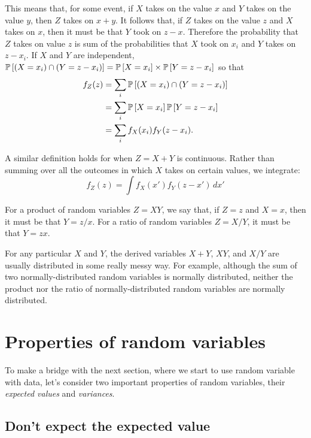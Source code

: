 This means that, for some event, if $X$ takes on the value $x$ and $Y$ takes
on the value $y$, then $Z$ takes on $x+y$. It follows that, if
$Z$ takes on the value $z$ and $X$ takes on $x$, then it must be that $Y$
took on $z - x$. Therefore the probability that $Z$ takes on value $z$ is
sum of the probabilities that $X$ took on $x_i$ and $Y$ takes on $z - x_i$.
If $X$ and $Y$ are independent,
$\mathbb{P}\left[{(X = x_i) \cap (Y = z - x_i)}\right] = \mathbb{P}\left[{X = x_i}\right] \times \mathbb{P}\left[{Y = z - x_i}\right]$
so that
\begin{align*}
f_Z(z) &= \sum_i \mathbb{P}\left[{(X=x_i) \cap (Y=z - x_i)}\right] \\
  &= \sum_i \mathbb{P}\left[{X=x_i}\right] \mathbb{P}\left[{Y=z-x_i}\right] \\
  &= \sum_i f_X(x_i) f_Y(z - x_i).
\end{align*}

A similar definition holds for when $Z = X + Y$ is continuous. Rather than
summing over all the outcomes in which $X$ takes on certain values, we integrate:
\begin{equation}
f_Z(z) = \int f_X(x') f_Y(z - x') \,dx'
\end{equation}

For a product of random variables $Z = XY$, we say that,
if $Z = z$ and $X = x$, then it must be that $Y = z/x$.
For a ratio of random variables $Z = X/Y$, it must be that $Y = zx$.

For any particular $X$ and $Y$, the derived variables $X + Y$, $XY$, and $X/Y$
are usually distributed in some really messy way. For example, although the
sum of two normally-distributed random variables is normally distributed,
neither the product nor the ratio of normally-distributed random variables are
normally distributed.

\section{Properties of random variables}

To make a bridge with the next section, where we start to use random variable
with data, let's consider two important properties of random variables, their
\emph{expected values} and \emph{variances}.

\subsection{Don't expect the expected value}

